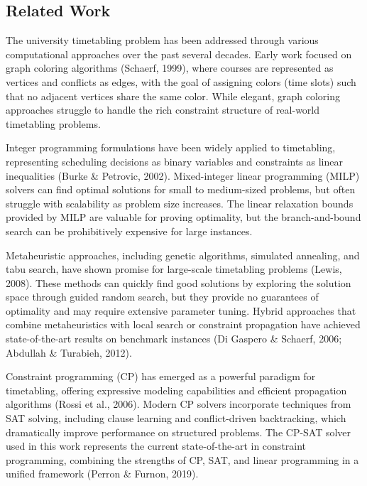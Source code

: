 \documentclass[12pt,a4paper]{article}
\begin{document}
\subsection{Related Work}

The university timetabling problem has been addressed through various computational approaches over the past several decades. Early work focused on graph coloring algorithms (Schaerf, 1999), where courses are represented as vertices and conflicts as edges, with the goal of assigning colors (time slots) such that no adjacent vertices share the same color. While elegant, graph coloring approaches struggle to handle the rich constraint structure of real-world timetabling problems.

Integer programming formulations have been widely applied to timetabling, representing scheduling decisions as binary variables and constraints as linear inequalities (Burke \& Petrovic, 2002). Mixed-integer linear programming (MILP) solvers can find optimal solutions for small to medium-sized problems, but often struggle with scalability as problem size increases. The linear relaxation bounds provided by MILP are valuable for proving optimality, but the branch-and-bound search can be prohibitively expensive for large instances.

Metaheuristic approaches, including genetic algorithms, simulated annealing, and tabu search, have shown promise for large-scale timetabling problems (Lewis, 2008). These methods can quickly find good solutions by exploring the solution space through guided random search, but they provide no guarantees of optimality and may require extensive parameter tuning. Hybrid approaches that combine metaheuristics with local search or constraint propagation have achieved state-of-the-art results on benchmark instances (Di Gaspero \& Schaerf, 2006; Abdullah \& Turabieh, 2012).

Constraint programming (CP) has emerged as a powerful paradigm for timetabling, offering expressive modeling capabilities and efficient propagation algorithms (Rossi et al., 2006). Modern CP solvers incorporate techniques from SAT solving, including clause learning and conflict-driven backtracking, which dramatically improve performance on structured problems. The CP-SAT solver used in this work represents the current state-of-the-art in constraint programming, combining the strengths of CP, SAT, and linear programming in a unified framework (Perron \& Furnon, 2019).
\end{document}
